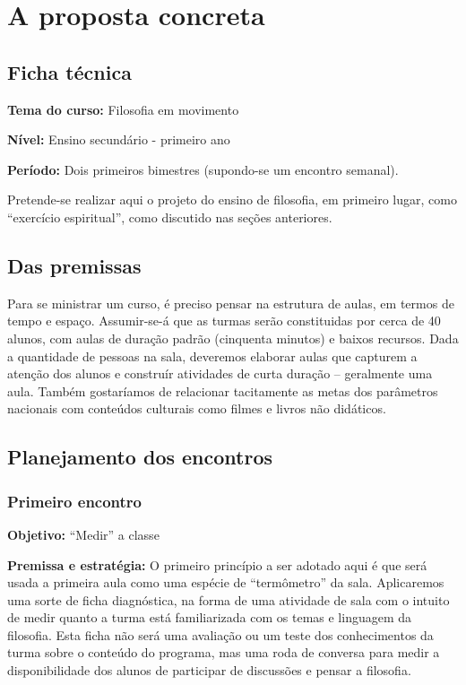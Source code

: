 \documentclass[12pt,a4paper]{article}
\begin{document}
	\newpage
	
	\section{A proposta concreta}
	
	\subsection{Ficha técnica}

	\textbf{Tema do curso:} Filosofia em movimento

	\textbf{Nível:} Ensino secundário - primeiro ano

	\textbf{Período:} Dois primeiros bimestres (supondo-se um encontro
	semanal). 

	Pretende-se realizar aqui o projeto do ensino de filosofia, em 
	primeiro lugar, como “exercício espiritual”, como discutido nas 
	seções anteriores. 

	\subsection{Das premissas}

	Para se ministrar um curso, é preciso pensar na 
	estrutura de aulas, em termos de tempo e espaço. Assumir-se-á que 
	as turmas serão constituidas por cerca de 40 alunos, com aulas de 
	duração padrão (cinquenta minutos) e baixos recursos. 
	Dada a quantidade de 
	pessoas na sala, deveremos elaborar aulas que capturem a atenção dos 
	alunos e construír atividades de curta duração -- geralmente uma aula.
	Também gostaríamos de relacionar tacitamente as metas dos parâmetros 
	nacionais com 	conteúdos culturais como filmes 
	e livros não didáticos. 

	\subsection{Planejamento dos encontros}

	\subsubsection{Primeiro encontro}

	\textbf{Objetivo:} “Medir” a classe

	\textbf{Premissa e estratégia:}
	O primeiro princípio a ser adotado aqui é que será usada a primeira aula 
	como uma espécie de ``termômetro'' da sala. Aplicaremos uma sorte de 
	ficha diagnóstica, na forma de uma atividade de sala com o intuito 
	de medir quanto a turma está familiarizada com os temas e linguagem 
	da filosofia. Esta ficha não será uma avaliação ou um teste dos 
	conhecimentos da turma sobre o conteúdo do programa, mas uma roda de 
	conversa para medir a disponibilidade dos alunos de participar de 
	discussões e pensar a filosofia. 
	
\end{document}
